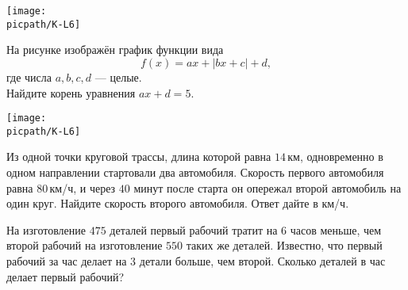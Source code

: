 \begin{homework}[number=1]
\begin{listofex}
\begin{minipage}[t]{\picwidth}
			\texttt{[image: \\picpath/K-L6]}
		\end{minipage}
		\item
		\begin{minipage}[t]{\bodywidth}
			На рисунке изображён график функции вида \[ f(x)=ax+|bx+c|+d, \] где числа \(a, b, c, d\) --- целые.\\ Найдите корень уравнения \(ax+d=5\).
		\end{minipage}
		\hspace{0.02\linewidth}
		\begin{minipage}[t]{\picwidth}
			\texttt{[image: \\picpath/K-L6]}
		\end{minipage}
		\item Из одной точки круговой трассы, длина которой равна \(14\) км, одновременно в одном направлении стартовали два автомобиля. Скорость первого автомобиля равна \(80\) км/ч, и через \(40\) минут после старта он опережал второй автомобиль на один круг. Найдите скорость второго автомобиля. Ответ дайте в км/ч.
		\item На изготовление \(475\) деталей первый рабочий тратит на \(6\) часов меньше, чем второй рабочий на изготовление \(550\) таких же деталей. Известно, что первый рабочий за час делает на \(3\) детали больше, чем второй. Сколько деталей в час делает первый рабочий?
	\end{listofex}
\end{homework}

